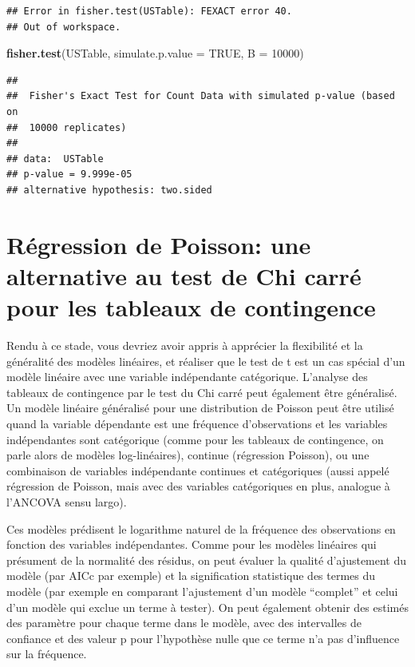 \documentclass[
  12pt,
]{book}
\newenvironment{Shaded}{\begin{snugshade}}{\end{snugshade}}
\newcommand{\DataTypeTok}[1]{\textcolor[rgb]{0.13,0.29,0.53}{#1}}
\newcommand{\DecValTok}[1]{\textcolor[rgb]{0.00,0.00,0.81}{#1}}
\newcommand{\KeywordTok}[1]{\textcolor[rgb]{0.13,0.29,0.53}{\textbf{#1}}}
\newcommand{\NormalTok}[1]{#1}
\newcommand{\OtherTok}[1]{\textcolor[rgb]{0.56,0.35,0.01}{#1}}
\begin{document}
\begin{verbatim}
## Error in fisher.test(USTable): FEXACT error 40.
## Out of workspace.
\end{verbatim}

\begin{Shaded}
\begin{Highlighting}[]
\KeywordTok{fisher.test}\NormalTok{(USTable, }\DataTypeTok{simulate.p.value =} \OtherTok{TRUE}\NormalTok{, }\DataTypeTok{B =} \DecValTok{10000}\NormalTok{)}
\end{Highlighting}
\end{Shaded}

\begin{verbatim}
## 
##  Fisher's Exact Test for Count Data with simulated p-value (based on
##  10000 replicates)
## 
## data:  USTable
## p-value = 9.999e-05
## alternative hypothesis: two.sided
\end{verbatim}

\hypertarget{ruxe9gression-de-poisson-une-alternative-au-test-de-chi-carruxe9-pour-les-tableaux-de-contingence}{%
\section{Régression de Poisson: une alternative au test de Chi carré pour les tableaux de contingence}\label{ruxe9gression-de-poisson-une-alternative-au-test-de-chi-carruxe9-pour-les-tableaux-de-contingence}}

Rendu à ce stade, vous devriez avoir appris à apprécier la flexibilité et la généralité des modèles linéaires, et réaliser que le test de t est un cas spécial d'un modèle linéaire avec une variable indépendante catégorique. L'analyse des tableaux de contingence par le test du Chi carré peut également être généralisé. Un modèle linéaire généralisé pour une distribution de Poisson peut être utilisé quand la variable dépendante est une fréquence d'observations et les variables indépendantes sont catégorique (comme pour les tableaux de contingence, on parle alors de modèles log-linéaires), continue (régression Poisson), ou une combinaison de variables indépendante continues et catégoriques (aussi appelé régression de Poisson, mais avec des variables catégoriques en plus, analogue à l'ANCOVA sensu largo).

Ces modèles prédisent le logarithme naturel de la fréquence des observations en fonction des variables indépendantes. Comme pour les modèles linéaires qui présument de la normalité des résidus, on peut évaluer la qualité d'ajustement du modèle (par AICc par exemple) et la signification statistique des termes du modèle (par exemple en comparant l'ajustement d'un modèle ``complet'' et celui d'un modèle qui exclue un terme à tester). On peut également obtenir des estimés des paramètre pour chaque terme dans le modèle, avec des intervalles de confiance et des valeur p pour l'hypothèse nulle que ce terme n'a pas d'influence sur la fréquence.
\end{document}
